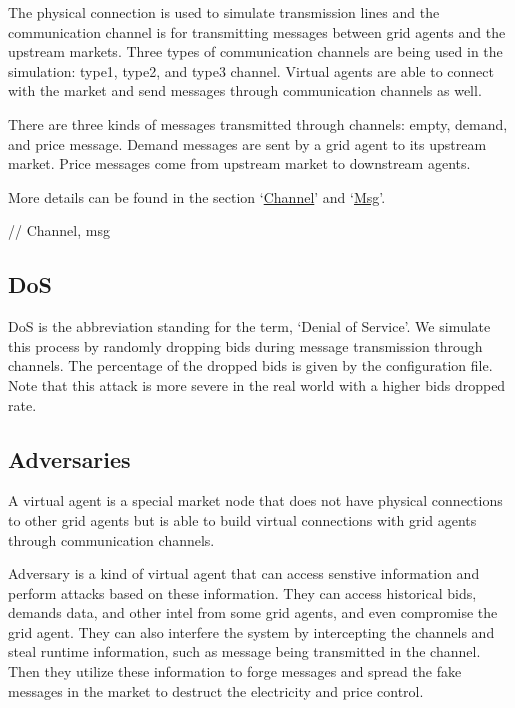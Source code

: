 \documentclass[12pt]{article}
\begin{document}
The physical connection is used to simulate transmission lines and 
the communication channel is for transmitting messages between grid agents and the upstream markets. 
Three types of communication channels are being used in the simulation: type1, type2, and type3 channel. 
Virtual agents are able to connect with the market and send messages through communication channels as well.

There are three kinds of messages transmitted through channels: empty, demand, and price message. 
Demand messages are sent by a grid agent to its upstream market. 
Price messages come from upstream market to downstream agents. 

More details can be found in the section `\hyperref[subsec:objects_channel]{Channel}' and
`\hyperref[subsec:objects_msg]{Msg}'. 

// Channel, msg 

\subsection{DoS} \mbox{}

DoS is the abbreviation standing for the term, `Denial of Service'. 
We simulate this process by randomly dropping bids during message transmission through channels. 
The percentage of the dropped bids is given by the configuration file. 
Note that this attack is more severe in the real world with a higher bids dropped rate.

\subsection{Adversaries} \mbox{}

A virtual agent is a special market node that does not have physical connections to other grid agents 
but is able to build virtual connections with grid agents through communication channels. 

Adversary is a kind of virtual agent that can access senstive information and 
perform attacks based on these information. 
They can access historical bids, demands data, and other intel from some grid agents, 
and even compromise the grid agent. 
They can also interfere the system by intercepting the channels and steal runtime information, 
such as message being transmitted in the channel. 
Then they utilize these information to forge messages and spread the fake messages 
in the market to destruct the electricity and price control. 
\end{document}

